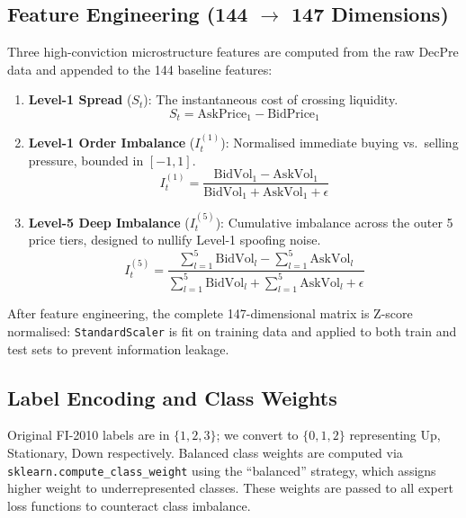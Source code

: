 \documentclass[conference]{IEEEtran}
\begin{document}
\subsection{Feature Engineering (144 $\rightarrow$ 147 Dimensions)}
Three high-conviction microstructure features are computed from the raw
DecPre data and appended to the 144 baseline features:

\begin{enumerate}
    \item \textbf{Level-1 Spread} ($S_t$): The instantaneous cost of crossing liquidity.
    \begin{equation}
        S_t = \text{AskPrice}_1 - \text{BidPrice}_1
    \end{equation}

    \item \textbf{Level-1 Order Imbalance} ($I_t^{(1)}$): Normalised immediate buying vs.\ selling pressure, bounded in $[-1, 1]$.
    \begin{equation}
        I_t^{(1)} = \frac{\text{BidVol}_1 - \text{AskVol}_1}{\text{BidVol}_1 + \text{AskVol}_1 + \epsilon}
    \end{equation}

    \item \textbf{Level-5 Deep Imbalance} ($I_t^{(5)}$): Cumulative imbalance across the outer 5 price tiers, designed to nullify Level-1 spoofing noise.
    \begin{equation}
        I_t^{(5)} = \frac{\sum_{l=1}^{5}\text{BidVol}_l - \sum_{l=1}^{5}\text{AskVol}_l}{\sum_{l=1}^{5}\text{BidVol}_l + \sum_{l=1}^{5}\text{AskVol}_l + \epsilon}
    \end{equation}
\end{enumerate}

After feature engineering, the complete 147-dimensional matrix is
Z-score normalised: \texttt{StandardScaler} is fit on training data
and applied to both train and test sets to prevent information leakage.

\subsection{Label Encoding and Class Weights}
Original FI-2010 labels are in $\{1, 2, 3\}$; we convert to
$\{0, 1, 2\}$ representing Up, Stationary, Down respectively.
Balanced class weights are computed via \texttt{sklearn.compute\_class\_weight}
using the ``balanced'' strategy, which assigns higher weight to
underrepresented classes. These weights are passed to all expert
loss functions to counteract class imbalance.
\end{document}
